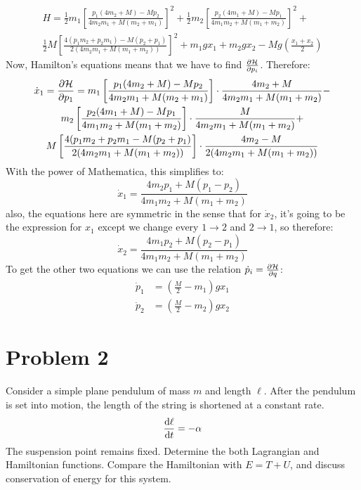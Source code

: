 \documentclass[10pt]{article}
\begin{document}
\begin{solution}
\begin{multline*}
			H = \frac{1}{2}m_1\left[\frac{p_1(4m_2 + M) - Mp_2}{4m_2m_1 + M(m_2 + m_1)}\right]^2 + \frac{1}{2}m_2\left[\frac{p_2(4m_1 + M) - Mp_1}{4m_1m_2 + M(m_1 + m_2)}\right]^2 +\\ \frac{1}{2}M\left[ \frac{4(p_1m_2 + p_2m_1) - M(p_2 + p_1)}{2(4m_2m_1 + M(m_1 + m_2))}\right]^2 +m_1gx_1 + m_2gx_2 - Mg\left( \frac{x_1 + x_2}{2} \right) 
		\end{multline*}
		Now, Hamilton's equations means that we have to find $\pdv{\mathcal H}{p_i}$. Therefore:
		\begin{multline*}
			\dot x_1 = \pdv{\mathcal H}{p_1} = m_1\left[\frac{p_1(4m_2 + M) - Mp_2}{4m_2m_1 + M(m_2 + m_1)}\right] \cdot \frac{4m_2 + M}{4m_2m_1 + M(m_1 + m_2)} -\\ m_2\left[\frac{p_2(4m_1 + M) - Mp_1}{4m_1m_2 + M(m_1 + m_2)}\right] \cdot \frac{M}{4m_2m_1 + M(m_1 + m_2)} +\\ M \left[ \frac{4(p_1m_2 + p_2m_1 - M(p_2 + p_1)}{2(4m_2m_1 + M(m_1 + m_2))}\right] \cdot \frac{4m_2 - M}{2(4m_2m_1 + M(m_1 + m_2))}
		\end{multline*}
		With the power of Mathematica, this simplifies to: 
		\[
			\dot x_1 = \frac{4m_2p_1 + M(p_1 - p_2)}{4m_1m_2 + M(m_1 + m_2)} 
		\] 
		also, the equations here are symmetric in the sense that for $\dot x_2$, it's going to be the expression
		for $x_1$ except we change every $1 \to 2$ and $2 \to 1$, so therefore:
		\[
			\dot x_2 = \frac{4m_1p_2 + M(p_2 - p_1)}{4m_1m_2 + M(m_1 + m_2)}
		\] 
		To get the other two equations we can use the relation $\dot p_i = \pdv{\mathcal H}{q}$:
		\begin{align*}
			\dot p_1 &= \left( \frac{M}{2} - m_1 \right) gx_1\\
			\dot p_2 &= \left( \frac{M}{2} - m_2 \right) gx_2
		\end{align*}
	\end{solution}

	\pagebreak

	\section*{Problem 2}
	Consider a simple plane pendulum of mass $m$ and length $\ell$. After the pendulum is set into motion, the 
	length of the string is shortened at a constant rate. 
	\[
		\dv{\ell}{t} = -\alpha
	\] 
	The suspension point remains fixed. Determine the both Lagrangian and Hamiltonian functions. Compare the 
	Hamiltonian with $E = T + U$, and discuss conservation of energy for this system.
\end{document}
